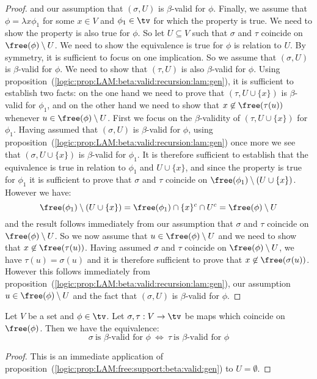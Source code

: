 \begin{proof}
    and our assumption that $(\sigma,U)$ is $\beta$-valid for $\phi$. Finally,
    we assume that $\phi=\lambda x\phi_{1}$ for some $x\in V$ and $\phi_{1}\in\tv$
    for which the property is true. We need to show the property is also true
    for $\phi$. So let $U\subseteq V$ such that $\sigma$ and $\tau$ coincide
    on $\free(\phi)\setminus U$. We need to show the equivalence is true for 
    $\phi$ is relation to $U$. By symmetry, it is sufficient to focus on one 
    implication. So we assume that $(\sigma,U)$ is $\beta$-valid for $\phi$.
    We need to show that $(\tau,U)$ is also $\beta$-valid for $\phi$. Using
    proposition~(\ref{logic:prop:LAM:beta:valid:recursion:lam:gen}), it is
    sufficient to establish two facts: on the one hand we need to prove
    that $(\tau, U\cup\{x\})$ is $\beta$-valid for $\phi_{1}$, and on the
    other hand we need to show that $x\not\in\free(\tau(u))$ whenever
    $u\in\free(\phi)\setminus U$. First we focus on the $\beta$-validity
    of $(\tau,U\cup\{x\})$ for $\phi_{1}$. Having assumed that $(\sigma,U)$
    is $\beta$-valid for $\phi$, using 
    proposition~(\ref{logic:prop:LAM:beta:valid:recursion:lam:gen}) once more
    we see that $(\sigma, U\cup\{x\})$ is $\beta$-valid for $\phi_{1}$.
    It is therefore sufficient to establish that the equivalence is true
    in relation to $\phi_{1}$ and $U\cup\{x\}$, and since the property is
    true for $\phi_{1}$ it is sufficient to prove that $\sigma$ and $\tau$
    coincide on $\free(\phi_{1})\setminus(U\cup\{x\})$. However we have:
        \[
            \free(\phi_{1})\setminus(U\cup\{x\})=
            \free(\phi_{1})\cap\{x\}^{c}\cap U^{c}=\free(\phi)\setminus U
        \]
    and the result follows immediately from our assumption that $\sigma$ 
    and $\tau$ coincide on $\free(\phi)\setminus U$. So we now assume that
    $u\in\free(\phi)\setminus U$ and we need to show that 
    $x\not\in\free(\tau(u))$. Having assumed $\sigma$ and $\tau$ coincide
    on $\free(\phi)\setminus U$, we have $\tau(u)=\sigma(u)$ and it is 
    therefore sufficient to prove that $x\not\in\free(\sigma(u))$. However
    this follows immediately from
    proposition~(\ref{logic:prop:LAM:beta:valid:recursion:lam:gen}), our
    assumption $u\in\free(\phi)\setminus U$ and the fact that $(\sigma,U)$
    is $\beta$-valid for $\phi$.
\end{proof}

\begin{prop}\label{logic:prop:LAM:free:support:beta:valid}
    Let $V$ be a set and $\phi\in\tv$. Let $\sigma,\tau:V\to\tv$ be maps which 
    coincide on $\free(\phi)$. Then we have the equivalence:
        \[
            \sigma\ \mbox{is $\beta$-valid for $\phi$}\ 
            \Leftrightarrow\
            \tau\ \mbox{is $\beta$-valid for $\phi$}
        \]
\end{prop}
\begin{proof}
    This is an immediate application of 
    proposition~(\ref{logic:prop:LAM:free:support:beta:valid:gen})
    to $U=\emptyset$.
\end{proof}

